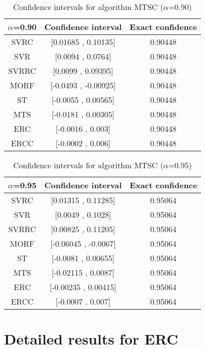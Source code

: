 \documentclass[a4paper,10pt]{article}
\begin{document}
\begin{table}[!htp]
\centering\small
\begin{tabular}{
|c|c|c|}
\hline
 $\alpha$=0.90 & Confidence interval & Exact confidence \\ \hline 
SVRC & [0.01685 , 0.10135] & 0.90448\\ \hline 
SVR & [0.0094 , 0.0764] & 0.90448\\ \hline 
SVRRC & [0.0099 , 0.09395] & 0.90448\\ \hline 
MORF & [-0.0493 , -0.00925] & 0.90448\\ \hline 
ST & [-0.0055 , 0.00565] & 0.90448\\ \hline 
MTS & [-0.0181 , 0.00305] & 0.90448\\ \hline 
ERC & [-0.0016 , 0.003] & 0.90448\\ \hline 
ERCC & [-0.0002 , 0.006] & 0.90448\\ \hline 

\end{tabular}
\caption{Confidence intervals for algorithm MTSC ($\alpha$=0.90)}
\end{table}
\begin{table}[!htp]
\centering\small
\begin{tabular}{
|c|c|c|}
\hline
 $\alpha$=0.95 & Confidence interval & Exact confidence \\ \hline 
SVRC & [0.01315 , 0.11285] & 0.95064\\ \hline 
SVR & [0.0049 , 0.1028] & 0.95064\\ \hline 
SVRRC & [0.00825 , 0.11205] & 0.95064\\ \hline 
MORF & [-0.06045 , -0.0067] & 0.95064\\ \hline 
ST & [-0.0081 , 0.00655] & 0.95064\\ \hline 
MTS & [-0.02115 , 0.0087] & 0.95064\\ \hline 
ERC & [-0.00235 , 0.00415] & 0.95064\\ \hline 
ERCC & [-0.0007 , 0.007] & 0.95064\\ \hline 

\end{tabular}
\caption{Confidence intervals for algorithm MTSC ($\alpha$=0.95)}
\end{table}

 \clearpage 


\section{Detailed results for ERC}
\end{document}
